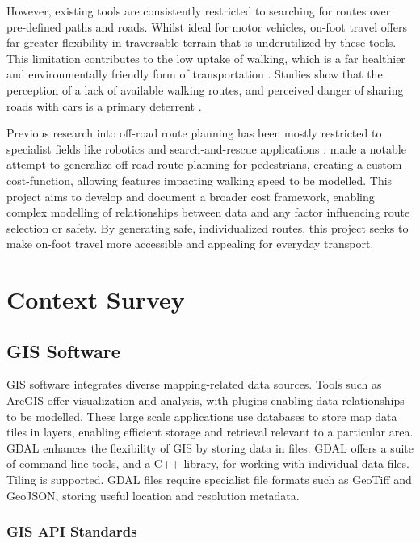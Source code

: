 \documentclass[12pt]{article}
\begin{document}
However, existing tools are consistently restricted to searching for routes over pre-defined paths and roads. Whilst ideal for motor vehicles, on-foot travel offers far greater flexibility in traversable terrain that is underutilized by these tools. This limitation contributes to the low uptake of walking, which is a far healthier and environmentally friendly form of transportation \autocite{ukgov2021travel}. Studies show that the perception of a lack of available walking routes, and perceived danger of sharing roads with cars is a primary deterrent \autocite{ek2021motives,singleton2019walking}.

Previous research into off-road route planning has been mostly restricted to specialist fields like robotics and search-and-rescue applications \autocite{perkins2013fielddstar,zhao2024searchrescue}. \textcite{evans2023tsr} made a notable attempt to generalize off-road route planning for pedestrians, creating a custom cost-function, allowing features impacting walking speed to be modelled. This project aims to develop and document a broader cost framework, enabling complex modelling of relationships between data and any factor influencing route selection or safety. By generating safe, individualized routes, this project seeks to make on-foot travel more accessible and appealing for everyday transport.

\section{Context Survey}

\subsection{GIS Software}

GIS software integrates diverse mapping-related data sources. Tools such as ArcGIS offer visualization and analysis, with plugins enabling data relationships to be modelled. These large scale applications use databases to store map data tiles in layers, enabling efficient storage and retrieval relevant to a particular area. GDAL \autocite{gdal} enhances the flexibility of GIS by storing data in files. GDAL offers a suite of command line tools, and a C++ library, for working with individual data files. Tiling is supported. GDAL files require specialist file formats such as GeoTiff and GeoJSON, storing useful location and resolution metadata.

\subsubsection{GIS API Standards}
\end{document}
